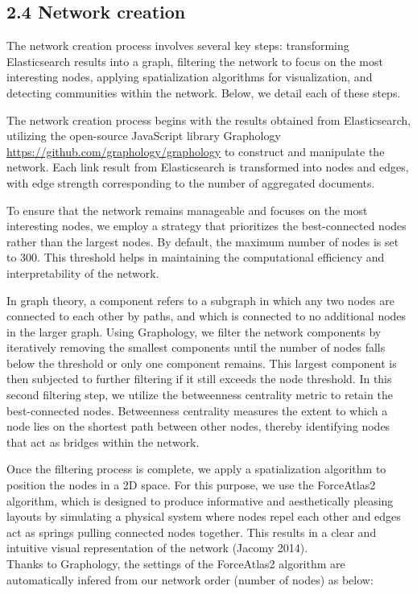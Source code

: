 \documentclass[
]{article}
\begin{document}
\hypertarget{network-creation}{%
\subsection{2.4 Network creation}\label{network-creation}}

The network creation process involves several key steps: transforming
Elasticsearch results into a graph, filtering the network to focus on
the most interesting nodes, applying spatialization algorithms for
visualization, and detecting communities within the network. Below, we
detail each of these steps.

The network creation process begins with the results obtained from
Elasticsearch, utilizing the open-source JavaScript library Graphology
\url{https://github.com/graphology/graphology} to construct and
manipulate the network. Each link result from Elasticsearch is
transformed into nodes and edges, with edge strength corresponding to
the number of aggregated documents.

To ensure that the network remains manageable and focuses on the most
interesting nodes, we employ a strategy that prioritizes the
best-connected nodes rather than the largest nodes. By default, the
maximum number of nodes is set to 300. This threshold helps in
maintaining the computational efficiency and interpretability of the
network.

In graph theory, a component refers to a subgraph in which any two nodes
are connected to each other by paths, and which is connected to no
additional nodes in the larger graph. Using Graphology, we filter the
network components by iteratively removing the smallest components until
the number of nodes falls below the threshold or only one component
remains. This largest component is then subjected to further filtering
if it still exceeds the node threshold. In this second filtering step,
we utilize the betweenness centrality metric to retain the
best-connected nodes. Betweenness centrality measures the extent to
which a node lies on the shortest path between other nodes, thereby
identifying nodes that act as bridges within the network.

Once the filtering process is complete, we apply a spatialization
algorithm to position the nodes in a 2D space. For this purpose, we use
the ForceAtlas2 algorithm, which is designed to produce informative and
aesthetically pleasing layouts by simulating a physical system where
nodes repel each other and edges act as springs pulling connected nodes
together. This results in a clear and intuitive visual representation of
the network (Jacomy 2014).\\
Thanks to Graphology, the settings of the ForceAtlas2 algorithm are
automatically infered from our network order (number of nodes) as below:
\end{document}
